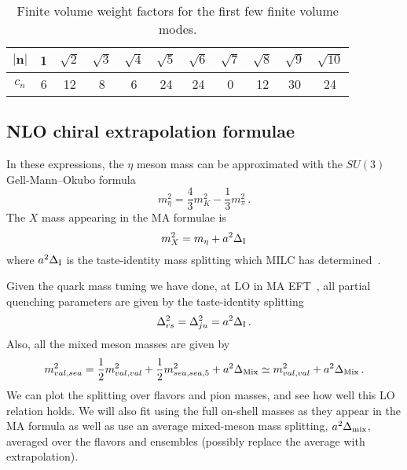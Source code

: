 \documentclass[prd,tightenlines,preprintnumbers,showpacs,superscriptaddress,notitlepage,nofootinbib,eqsecnum,floatfix,notitlepage]{revtex4-1}
\begin{document}
\begin{table}
	\begin{ruledtabular}
		\begin{tabular}{c|cccccccccc}
			$|\mathbf{n}|$& 1 & $\sqrt{2}$& $\sqrt{3}$& $\sqrt{4}$& $\sqrt{5}$& $\sqrt{6}$& $\sqrt{7}$& $\sqrt{8}$& $\sqrt{9}$& $\sqrt{10}$\\
			\hline
			$c_n$& 6&12& 8& 6& 24& 24& 0& 12& 30& 24
		\end{tabular}
	\end{ruledtabular}
	\caption{\label{tab:cN_weights}
		Finite volume weight factors for the first few finite volume modes.
	}
\end{table}



\subsection{NLO chiral extrapolation formulae}

In these expressions, the $\eta$ meson mass can be approximated with the $SU(3)$ Gell-Mann--Okubo formula
\begin{equation}
m_\eta^2 = \frac{4}{3} m_K^2 - \frac{1}{3}m_\pi^2\, .
\end{equation}
The $X$ mass appearing in the MA formulae is
\begin{equation}
m_X^2 = m_\eta + a^2 \Delta_{\rm I}
\end{equation}
where $a^2 \Delta_{\rm I}$ is the taste-identity mass splitting which MILC has determined~\cite{Bazavov:2012xda}.

Given the quark mass tuning we have done, at LO in MA EFT~\cite{Chen:2006wf}, all partial quenching parameters are given by the taste-identity splitting
\begin{equation}
\Delta_{rs}^2 = \Delta_{ju}^2 = a^2 \Delta_{\rm I}\, .
\end{equation}
Also, all the mixed meson masses are given by
\begin{equation}
m_{val,sea}^2 = \frac{1}{2}m_{val,val}^2 + \frac{1}{2}m_{sea,sea,5}^2 + a^2 \Delta_{\rm Mix}
\simeq m_{val,val}^2 + a^2 \Delta_{\rm Mix}\, .
\end{equation}
We can plot the splitting over flavors and pion masses, and see how well this LO relation holds.  We will also fit using the full on-shell masses as they appear in the MA formula as well as use an average mixed-meson mass splitting, $a^2 \Delta_{\rm mix}$, averaged over the flavors and ensembles (possibly replace the average with extrapolation).
\end{document}
